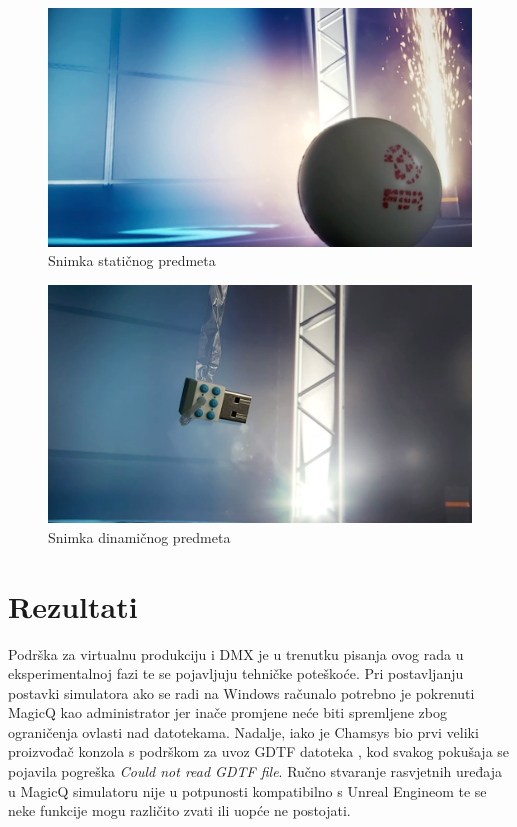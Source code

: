 \documentclass[times, utf8, zavrsni, numeric]{fer}
\begin{document}
\begin{figure}[htp]
	\centering
	\includegraphics[width=\linewidth]{slika 7-2.png}
	\caption{Snimka statičnog predmeta}
	\label{fig:slika 7-2}
\end{figure}

\begin{figure}[htp]
	\centering
	\includegraphics[width=\linewidth]{slika 7-3.png}
	\caption{Snimka dinamičnog predmeta}
	\label{fig:slika 7-3}
\end{figure}

\chapter{Rezultati}
Podrška za virtualnu produkciju i DMX je u trenutku pisanja ovog rada u eksperimentalnoj fazi te se pojavljuju tehničke poteškoće. Pri postavljanju postavki simulatora ako se radi na Windows računalo potrebno je pokrenuti MagicQ kao administrator jer inače promjene neće biti spremljene zbog ograničenja ovlasti nad datotekama. Nadalje, iako je Chamsys bio prvi veliki proizvođač konzola s podrškom za uvoz GDTF datoteka \cite{MagicQ_GDTF}, kod svakog pokušaja se pojavila pogreška \emph{Could not read GDTF file}. Ručno stvaranje rasvjetnih uređaja u MagicQ simulatoru nije u potpunosti kompatibilno s Unreal Engineom te se neke funkcije mogu različito zvati ili uopće ne postojati. \newline
\end{document}

